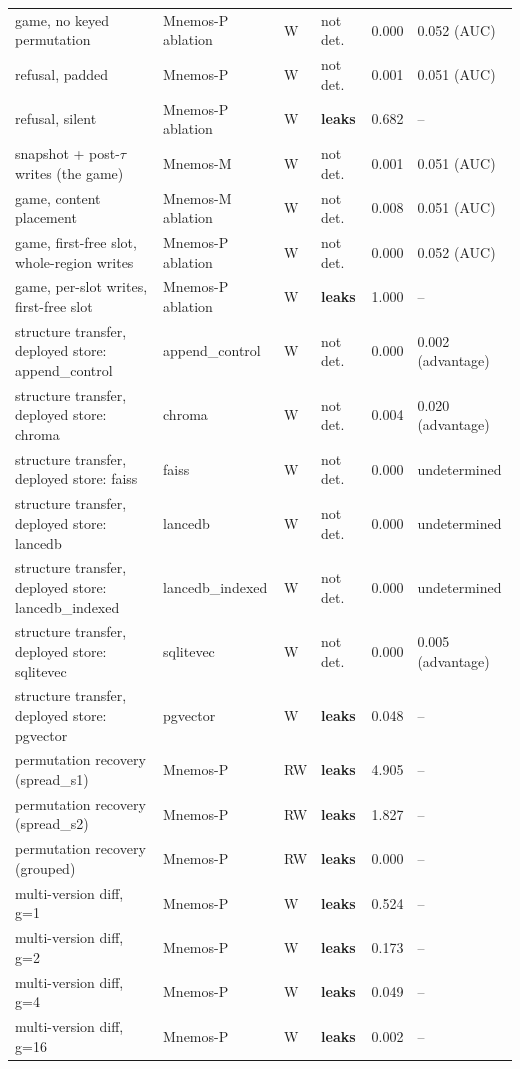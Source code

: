 \begin{table}[t]
\begin{tabular}{llllrl}
game, no keyed permutation & Mnemos-P ablation & W & not det. & 0.000 & 0.052 (AUC) \\
refusal, padded & Mnemos-P & W & not det. & 0.001 & 0.051 (AUC) \\
refusal, silent & Mnemos-P ablation & W & \textbf{leaks} & 0.682 & -- \\
snapshot + post-$\tau$ writes (the game) & Mnemos-M & W & not det. & 0.001 & 0.051 (AUC) \\
game, content placement & Mnemos-M ablation & W & not det. & 0.008 & 0.051 (AUC) \\
game, first-free slot, whole-region writes & Mnemos-P ablation & W & not det. & 0.000 & 0.052 (AUC) \\
game, per-slot writes, first-free slot & Mnemos-P ablation & W & \textbf{leaks} & 1.000 & -- \\
structure transfer, deployed store: append\_control & append\_control & W & not det. & 0.000 & 0.002 (advantage) \\
structure transfer, deployed store: chroma & chroma & W & not det. & 0.004 & 0.020 (advantage) \\
structure transfer, deployed store: faiss & faiss & W & not det. & 0.000 & undetermined \\
structure transfer, deployed store: lancedb & lancedb & W & not det. & 0.000 & undetermined \\
structure transfer, deployed store: lancedb\_indexed & lancedb\_indexed & W & not det. & 0.000 & undetermined \\
structure transfer, deployed store: sqlitevec & sqlitevec & W & not det. & 0.000 & 0.005 (advantage) \\
structure transfer, deployed store: pgvector & pgvector & W & \textbf{leaks} & 0.048 & -- \\
permutation recovery (spread\_s1) & Mnemos-P & RW & \textbf{leaks} & 4.905 & -- \\
permutation recovery (spread\_s2) & Mnemos-P & RW & \textbf{leaks} & 1.827 & -- \\
permutation recovery (grouped) & Mnemos-P & RW & \textbf{leaks} & 0.000 & -- \\
multi-version diff, g=1 & Mnemos-P & W & \textbf{leaks} & 0.524 & -- \\
multi-version diff, g=2 & Mnemos-P & W & \textbf{leaks} & 0.173 & -- \\
multi-version diff, g=4 & Mnemos-P & W & \textbf{leaks} & 0.049 & -- \\
multi-version diff, g=16 & Mnemos-P & W & \textbf{leaks} & 0.002 & -- \\

\end{tabular}
\end{table}

